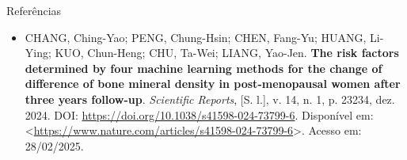 \documentclass{libs/ufc_format}
\begin{document}
%
%
\begin{frame}{Referências}
    \begin{itemize}
    	\justifying
    	\item CHANG, Ching-Yao; PENG, Chung-Hsin; CHEN, Fang-Yu; HUANG, Li-Ying; KUO, Chun-Heng; CHU, Ta-Wei; LIANG, Yao-Jen. \textbf{The risk factors determined by four machine learning methods for the change of difference of bone mineral density in post-menopausal women after three years follow-up}. \textit{Scientific Reports}, [S. l.], v. 14, n. 1, p. 23234, dez. 2024. DOI: \url{https://doi.org/10.1038/s41598-024-73799-6}. Disponível em: <\url{https://www.nature.com/articles/s41598-024-73799-6}>. Acesso em: 28/02/2025.
    \end{itemize}
\end{frame}
\end{document}
